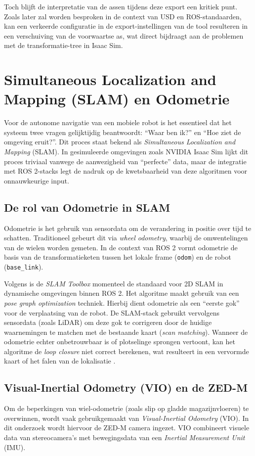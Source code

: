 Toch blijft de interpretatie van de assen tijdens deze export een kritiek punt. Zoals later zal worden besproken in de context van USD en ROS-standaarden, kan een verkeerde configuratie in de export-instellingen van de tool resulteren in een verschuiving van de voorwaartse as, wat direct bijdraagt aan de problemen met de transformatie-tree in Isaac Sim.

\section{Simultaneous Localization and Mapping (SLAM) en Odometrie}
\label{sec:slam_odometrie}

Voor de autonome navigatie van een mobiele robot is het essentieel dat het systeem twee vragen gelijktijdig beantwoordt: ``Waar ben ik?'' en ``Hoe ziet de omgeving eruit?''. Dit proces staat bekend als \textit{Simultaneous Localization and Mapping} (SLAM). In gesimuleerde omgevingen zoals NVIDIA Isaac Sim lijkt dit proces triviaal vanwege de aanwezigheid van ``perfecte'' data, maar de integratie met ROS 2-stacks legt de nadruk op de kwetsbaarheid van deze algoritmen voor onnauwkeurige input.

\subsection{De rol van Odometrie in SLAM}
Odometrie is het gebruik van sensordata om de verandering in positie over tijd te schatten. Traditioneel gebeurt dit via \textit{wheel odometry}, waarbij de omwentelingen van de wielen worden gemeten. In de context van ROS 2 vormt odometrie de basis van de transformatieketen tussen het lokale frame (\texttt{odom}) en de robot (\texttt{base\_link}).

Volgens \textcite{Macenski2021} is de \textit{SLAM Toolbox} momenteel de standaard voor 2D SLAM in dynamische omgevingen binnen ROS 2. Het algoritme maakt gebruik van een \textit{pose graph optimization} techniek. Hierbij dient odometrie als een ``eerste gok'' voor de verplaatsing van de robot. De SLAM-stack gebruikt vervolgens sensordata (zoals LiDAR) om deze gok te corrigeren door de huidige waarnemingen te matchen met de bestaande kaart (\textit{scan matching}). Wanneer de odometrie echter onbetrouwbaar is of plotselinge sprongen vertoont, kan het algoritme de \textit{loop closure} niet correct berekenen, wat resulteert in een vervormde kaart of het falen van de lokalisatie \autocite{Macenski2021}.

\subsection{Visual-Inertial Odometry (VIO) en de ZED-M}
Om de beperkingen van wiel-odometrie (zoals slip op gladde magazijnvloeren) te overwinnen, wordt vaak gebruikgemaakt van \textit{Visual-Inertial Odometry} (VIO). In dit onderzoek wordt hiervoor de ZED-M camera ingezet. VIO combineert visuele data van stereocamera's met bewegingsdata van een \textit{Inertial Measurement Unit} (IMU).

